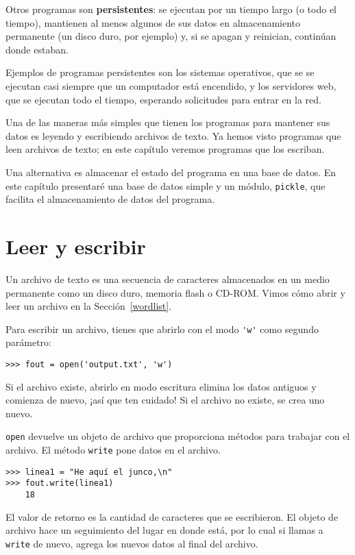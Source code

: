 \documentclass[10pt]{book}
\begin{document}
Otros programas son {\bf persistentes}: se ejecutan por un tiempo largo
(o todo el tiempo), mantienen al menos algunos de sus datos
en almacenamiento permanente (un disco duro, por ejemplo) y,
si se apagan y reinician, continúan donde estaban.

Ejemplos de programas persistentes son los sistemas operativos, que se
se ejecutan casi siempre que un computador está encendido, y los servidores web,
que se ejecutan todo el tiempo, esperando solicitudes para entrar en
la red.

Una de las maneras más simples que tienen los programas para mantener sus datos 
es leyendo y escribiendo archivos de texto.  Ya hemos visto
programas que leen archivos de texto; en este capítulo veremos programas
que los escriban.

Una alternativa es almacenar el estado del programa en una base de datos.
En este capítulo presentaré una base de datos simple y un módulo,
{\tt pickle}, que facilita el almacenamiento de datos del programa.


\section{Leer y escribir}

Un archivo de texto es una secuencia de caracteres almacenados en un medio
permanente como un disco duro, memoria flash o CD-ROM.  Vimos cómo
abrir y leer un archivo en la Sección~\ref{wordlist}.

Para escribir un archivo, tienes que abrirlo con el modo \verb"'w'" como segundo
parámetro:

\begin{verbatim}
>>> fout = open('output.txt', 'w')
\end{verbatim}
%
Si el archivo existe, abrirlo en modo escritura elimina
los datos antiguos y comienza de nuevo, ¡así que ten cuidado!
Si el archivo no existe, se crea uno nuevo.

{\tt open} devuelve un objeto de archivo que proporciona métodos para trabajar
con el archivo.
El método {\tt write} pone datos en el archivo.

\begin{verbatim}
>>> linea1 = "He aquí el junco,\n"
>>> fout.write(linea1)
    18
\end{verbatim}
%
El valor de retorno es la cantidad de caracteres que se escribieron.
El objeto de archivo hace un seguimiento del lugar en donde está, por lo cual si
llamas a {\tt write} de nuevo, agrega los nuevos datos al final del
archivo.
\end{document}
